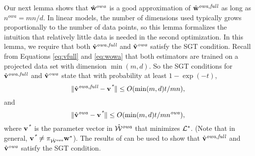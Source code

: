 \documentclass[thesis.tex]{subfiles}
\newcommand{\nowa}{n^{\textit{owa}}}
\begin{document}
Our next lemma shows that $\hat{\mathbf w}^{owa}$ is a good approximation of $\hat{\mathbf w}^{\textit{owa,full}}$ as long as $\nowa=mn/d$. 
In linear models, the number of dimensions used typically grows proportionally to the number of data points, so this lemma formalizes the intuition that relatively little data is needed in the second optimization.
In this lemma, we require that both $\hat{\mathbf{v}}^{\textit{owa,full}}$ and $\hat{\mathbf{v}}^{\textit{owa}}$ satisfy the SGT condition.
Recall from Equations \ref{eq:vfull} and \ref{eq:wowa} that both estimators are trained on a projected data set with dimension $\min(m,d)$.
So the SGT conditions for $\hat{\mathbf{v}}^{\textit{owa,full}}$ and $\hat{\mathbf{v}}^{\textit{owa}}$ state that with probability at least $1-\exp(-t)$,
\vspace{-0.15in}
\begin{equation}
    {\lVert {\hat{\mathbf{v}}^{\textit{owa,full}}-\mathbf{v}^{\textit{*}}} \rVert} \le O(\min(m,d)t/mn),
\end{equation}
    and
\begin{equation}
    \ltwo{\vowa-\vstar} \le O(\min(m,d)t/m\nowa),
\end{equation}
where $\mathbf{v}^{\textit{*}}$ is the parameter vector in ${\hat {{\mathcal W}}^{\textit{owa}}}$ that minimizes $\mathcal{L}^*$.
(Note that in general, $\mathbf{v}^{\textit{*}}\ne\pi_{{{\hat {{\mathcal W}}^{\textit{owa}}}}}{\mathbf w^{*}}$).
The results of \citet{spokoiny2012parametricestimation} can be used to show that $\hat{\mathbf{v}}^{\textit{owa,full}}$ and $\hat{\mathbf{v}}^{\textit{owa}}$ satisfy the SGT condition.

\end{document}
